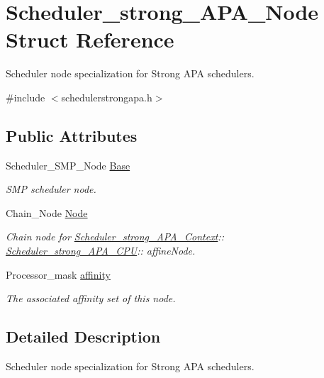 \hypertarget{structScheduler__strong__APA__Node}{}\section{Scheduler\+\_\+strong\+\_\+\+A\+P\+A\+\_\+\+Node Struct Reference}
\label{structScheduler__strong__APA__Node}


Scheduler node specialization for Strong A\+PA schedulers.  




{\ttfamily \#include $<$schedulerstrongapa.\+h$>$}

\subsection*{Public Attributes}
\begin{DoxyCompactItemize}
\item 
Scheduler\+\_\+\+S\+M\+P\+\_\+\+Node \hyperlink{structScheduler__strong__APA__Node_ae86cbf5fd8743267abe33bed6d8b0fe6}{Base}
\begin{DoxyCompactList}\small\item\em S\+MP scheduler node. \end{DoxyCompactList}\item 
Chain\+\_\+\+Node \hyperlink{structScheduler__strong__APA__Node_aed93ad80a3757ffbbe0a0d1b5426b3cc}{Node}
\begin{DoxyCompactList}\small\item\em Chain node for \hyperlink{structScheduler__strong__APA__Context}{Scheduler\+\_\+strong\+\_\+\+A\+P\+A\+\_\+\+Context}\+:\+: \hyperlink{structScheduler__strong__APA__CPU}{Scheduler\+\_\+strong\+\_\+\+A\+P\+A\+\_\+\+C\+PU}\+:\+: affine\+Node. \end{DoxyCompactList}\item 
Processor\+\_\+mask \hyperlink{structScheduler__strong__APA__Node_a2e8928b11f1738a11c228780eb849989}{affinity}
\begin{DoxyCompactList}\small\item\em The associated affinity set of this node. \end{DoxyCompactList}\end{DoxyCompactItemize}


\subsection{Detailed Description}
Scheduler node specialization for Strong A\+PA schedulers. 

